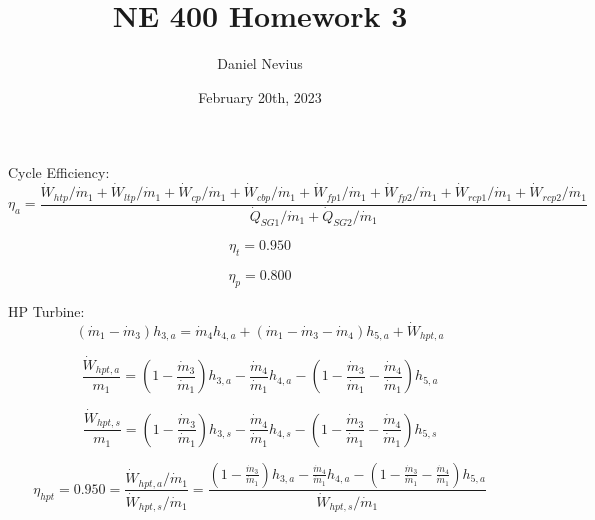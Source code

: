 \documentclass{article}
\title{NE 400 Homework 3}
\author{Daniel Nevius}
\date{February 20th, 2023}
\begin{document}
\maketitle

\section{}


Cycle Efficiency:
\begin{equation}
\eta_{a} = \frac{\dot{W}_{htp    } / \dot{m}_{1} + \dot{W}_{ltp    } / \dot{m}_{1} + \dot{W}_{cp     } / \dot{m}_{1} + \dot{W}_{cbp    } / \dot{m}_{1} + \dot{W}_{fp1    } / \dot{m}_{1} + \dot{W}_{fp2    } / \dot{m}_{1} + \dot{W}_{rcp1   } / \dot{m}_{1} + \dot{W}_{rcp2   } / \dot{m}_{1}}{\dot{Q}_{SG1    } / \dot{m}_{1} + \dot{Q}_{SG2    } / \dot{m}_{1}}
\end{equation}

\begin{equation}
\eta_{t} =    0.950
\end{equation}

\begin{equation}
\eta_{p} =    0.800
\end{equation}


HP Turbine:
\begin{equation}
(\dot{m}_{ 1} - \dot{m}_{ 3})h_{ 3,a} = \dot{m}_{ 4}h_{ 4,a} + (\dot{m}_{ 1} - \dot{m}_{ 3} - \dot{m}_{ 4})h_{ 5,a} + \dot{W}_{hpt,a}
\end{equation}

\begin{equation}
\frac{\dot{W}_{hpt,a}}{m_1} = (1 - \frac{\dot{m}_{ 3}}{\dot{m}_{ 1}})h_{ 3,a} - \frac{\dot{m}_{ 4}}{\dot{m}_{ 1}}h_{ 4,a} - (1 - \frac{\dot{m}_{ 3}}{\dot{m}_{ 1}} - \frac{\dot{m}_{ 4}}{\dot{m}_{ 1}})h_{ 5,a}\end{equation}

\begin{equation}
\frac{\dot{W}_{hpt,s}}{m_1} = (1 - \frac{\dot{m}_{ 3}}{\dot{m}_{ 1}})h_{ 3,s} - \frac{\dot{m}_{ 4}}{\dot{m}_{ 1}}h_{ 4,s} - (1 - \frac{\dot{m}_{ 3}}{\dot{m}_{ 1}} - \frac{\dot{m}_{ 4}}{\dot{m}_{ 1}})h_{ 5,s}\end{equation}

\begin{equation}
\eta_{hpt} =    0.950 = \frac{\dot{W}_{hpt,a} / \dot{m}_{1}}{\dot{W}_{hpt,s} / \dot{m}_{1}} = \frac{
(1 - \frac{\dot{m}_{ 3}}{\dot{m}_{ 1}})h_{ 3,a} - \frac{\dot{m}_{ 4}}{\dot{m}_{ 1}}h_{ 4,a} - (1 - \frac{\dot{m}_{ 3}}{\dot{m}_{ 1}} - \frac{\dot{m}_{ 4}}{\dot{m}_{ 1}})h_{ 5,a}}{\dot{W}_{hpt,s} / \dot{m}_{1}}
\end{equation}
\end{document}
